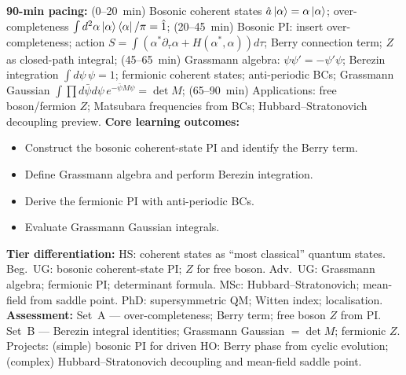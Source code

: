 \documentclass[11pt,a4paper]{article}
\begin{document}
\begin{tcolorbox}[modulebox, title={Module~II.2 / L07: Coherent-State Path Integrals}]
\textbf{90-min pacing:} (0--20~min) Bosonic coherent states $\hat{a}\ket{\alpha}=\alpha\ket{\alpha}$; over-completeness $\int d^2\alpha\ket{\alpha}\bra{\alpha}/\pi=\hat{1}$; (20--45~min) Bosonic PI: insert over-completeness; action $S=\int(\alpha^*\partial_\tau\alpha+H(\alpha^*,\alpha))d\tau$; Berry connection term; $Z$ as closed-path integral; (45--65~min) Grassmann algebra: $\psi\psi'=-\psi'\psi$; Berezin integration $\int d\psi\,\psi=1$; fermionic coherent states; anti-periodic BCs; Grassmann Gaussian $\int\prod d\bar\psi d\psi\,e^{-\bar\psi M\psi}=\det M$; (65--90~min) Applications: free boson/fermion $Z$; Matsubara frequencies from BCs; Hubbard--Stratonovich decoupling preview.
\medskip\textbf{Core learning outcomes:}
\begin{itemize}[leftmargin=1.4em,topsep=2pt,itemsep=1pt]
  \item Construct the bosonic coherent-state PI and identify the Berry term.
  \item Define Grassmann algebra and perform Berezin integration.
  \item Derive the fermionic PI with anti-periodic BCs.
  \item Evaluate Grassmann Gaussian integrals.
\end{itemize}
\medskip\textbf{Tier differentiation:}
HS: coherent states as ``most classical'' quantum states.
Beg.\ UG: bosonic coherent-state PI; $Z$ for free boson.
Adv.\ UG: Grassmann algebra; fermionic PI; determinant formula.
MSc: Hubbard--Stratonovich; mean-field from saddle point.
PhD: supersymmetric QM; Witten index; localisation.
\medskip\textbf{Assessment:}
Set~A --- over-completeness; Berry term; free boson $Z$ from PI.
Set~B --- Berezin integral identities; Grassmann Gaussian $=\det M$; fermionic $Z$.
Projects: (simple) bosonic PI for driven HO: Berry phase from cyclic evolution; (complex) Hubbard--Stratonovich decoupling and mean-field saddle point.
\end{tcolorbox}

\medskip
\end{document}
